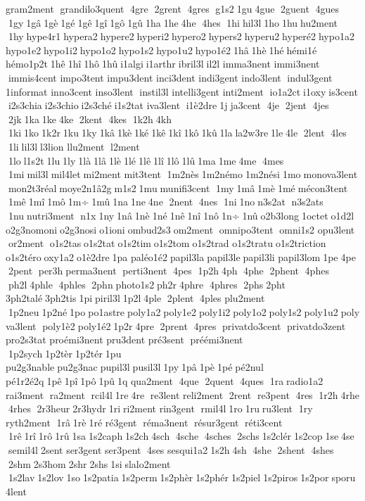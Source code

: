 gram2ment  grandilo3quent  4gre  2grent  4gres  g1s2 1gu 4gue  2guent  4gues  1gy 1gâ 1gè 1gé 1gê 1gî 1gô 1gû 1ha 1he 4he  4hes  1hi hil3l 1ho 1hu hu2ment  1hy hype4r1 hypera2 hypere2 hyperi2 hypero2 hypers2 hyperu2 hyperé2 hypo1a2 hypo1e2 hypo1i2 hypo1o2 hypo1s2 hypo1u2 hypo1é2 1hâ 1hè 1hé hémi1é 	hémo1p2t 1hê 1hî 1hô 1hû i1algi i1arthr ibril3l il2l 
imma3nent  
immi3nent  immis4cent  
impo3tent  
impu3dent  
inci3dent  
indi3gent  
indo3lent  indul3gent  	1informat 
inno3cent  
inso3lent  instil3l 
intelli3gent  
inti2ment  io1a2ct i1oxy is3cent  i2s3chia i2s3chio i2s3ché i1s2tat 	iva3lent  i1è2dre 1j ja3cent  4je  2jent  4jes  2jk 1ka 1ke 4ke  2kent  4kes  1k2h 4kh  1ki 1ko 1k2r 1ku 1ky 1kâ 1kè 1ké 1kê 1kî 1kô 1kû 1la la2w3re 1le 4le  2lent  4les  1li lil3l l3lion 	llu2ment  l2ment  1lo l1s2t 1lu 1ly 1là 1lâ 1lè 1lé 1lê 1lî 1lô 1lû 1ma 1me 4me  4mes  1mi mil3l mil4let mi2ment  	mit3tent  1m2nès 1m2némo 1m2nési 1mo monova3lent  mon2t3réal moye2n1â2g m1s2 1mu munifi3cent  1my 1mâ 1mè 1mé mécon3tent  1mê 1mî 1mô 1m÷ 1mû 1na 1ne 4ne  2nent  4nes  1ni 1no n3s2at  n3s2ats  1nu nutri3ment  n1x 1ny 1nâ 1nè 1né 1nê 1nî 1nô 1n÷ 1nû o2b3long 1octet o1d2l 
o2g3nomoni o2g3nosi o1ioni ombud2s3 om2ment  omnipo3tent  omni1s2 	opu3lent  or2ment  o1s2tas o1s2tat o1s2tim o1s2tom o1s2trad 	o1s2tratu o1s2triction 	o1s2téro oxy1a2 o1è2dre 1pa 
paléo1é2 papil3la papil3le papil3li 	papil3lom 1pe 4pe  2pent  per3h perma3nent  perti3nent  4pes  1p2h 4ph  4phe  2phent  4phes  ph2l 4phle  4phles  2phn photo1s2 ph2r 4phre  4phres  2phs 2pht 	3ph2talé 3ph2tis 1pi piril3l 1p2l 4ple  2plent  4ples  	plu2ment  1p2neu 1p2né 1po po1astre poly1a2 poly1e2 poly1i2 poly1o2 poly1s2 poly1u2 polyva3lent  poly1è2 poly1é2 1p2r 4pre  2prent  4pres  privatdo3cent  privatdo3zent  	pro2s3tat 
proémi3nent  	pru3dent  
pré3sent  préémi3nent  1p2sych 1p2tèr 1p2tér 1pu 
pu2g3nable pu2g3nac pupil3l pusil3l 1py 1pâ 1pè 1pé pé2nul 
pé1r2é2q 1pê 1pî 1pô 1pû 1q 	qua2ment  4que  2quent  4ques  1ra radio1a2 	rai3ment  ra2ment  rcil4l 1re 4re  re3lent  
reli2ment  2rent  re3pent  4res  1r2h 4rhe  4rhes  2r3heur 2r3hydr 1ri ri2ment  	rin3gent  rmil4l 1ro 1ru ru3lent  1ry 
ryth2ment  1râ 1rè 1ré 	ré3gent  réma3nent  résur3gent  réti3cent  1rê 1rî 1rô 1rû 1sa 1s2caph 1s2ch 4sch  4sche  4sches  2schs 1s2clér 1s2cop 1se 4se  semil4l 2sent  	ser3gent  	ser3pent  4ses  	sesqui1a2 1s2h 4sh  4she  2shent  4shes  2shm 2s3hom 2shr 2shs 1si slalo2ment  1s2lav 1s2lov 1so 1s2patia 1s2perm 1s2phèr 1s2phér 1s2piel 1s2piros 1s2por sporu4lent  
